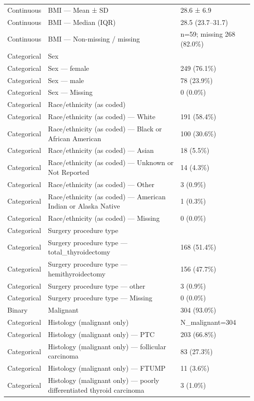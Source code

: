 \begin{table}[htbp]
\begin{tabular}{lll}
Continuous & BMI — Mean ± SD & 28.6 ± 6.9 \\
Continuous & BMI — Median (IQR) & 28.5 (23.7–31.7) \\
Continuous & BMI — Non-missing / missing & n=59; missing 268 (82.0\%) \\
Categorical & Sex &  \\
Categorical & Sex — female & 249 (76.1\%) \\
Categorical & Sex — male & 78 (23.9\%) \\
Categorical & Sex — Missing & 0 (0.0\%) \\
Categorical & Race/ethnicity (as coded) &  \\
Categorical & Race/ethnicity (as coded) — White & 191 (58.4\%) \\
Categorical & Race/ethnicity (as coded) — Black or African American & 100 (30.6\%) \\
Categorical & Race/ethnicity (as coded) — Asian & 18 (5.5\%) \\
Categorical & Race/ethnicity (as coded) — Unknown or Not Reported & 14 (4.3\%) \\
Categorical & Race/ethnicity (as coded) — Other & 3 (0.9\%) \\
Categorical & Race/ethnicity (as coded) — American Indian or Alaska Native & 1 (0.3\%) \\
Categorical & Race/ethnicity (as coded) — Missing & 0 (0.0\%) \\
Categorical & Surgery procedure type &  \\
Categorical & Surgery procedure type — total\_thyroidectomy & 168 (51.4\%) \\
Categorical & Surgery procedure type — hemithyroidectomy & 156 (47.7\%) \\
Categorical & Surgery procedure type — other & 3 (0.9\%) \\
Categorical & Surgery procedure type — Missing & 0 (0.0\%) \\
Binary & Malignant & 304 (93.0\%) \\
Categorical & Histology (malignant only) & N\_malignant=304 \\
Categorical & Histology (malignant only) — PTC & 203 (66.8\%) \\
Categorical & Histology (malignant only) — follicular carcinoma & 83 (27.3\%) \\
Categorical & Histology (malignant only) — FTUMP & 11 (3.6\%) \\
Categorical & Histology (malignant only) — poorly differentiated thyroid carcinoma & 3 (1.0\%) \\

\end{tabular}
\end{table}
